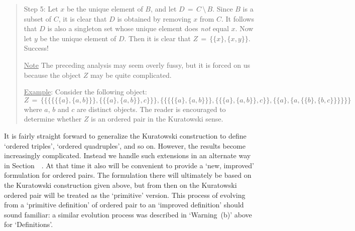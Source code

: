 \begin{quotation}
{        Step 5: Let $x$ be the unique element of $B$, and let $D \,=\, C\,{\setminus}\,B$.
    Since $B$ is a subset of $C$, it is clear that $D$ is obtained by removing $x$ from $C$.
    It follows that $D$ is also a singleton set whose unique element does {\em not} equal $x$.
    Now let $y$ be the unique element of $D$. Then it is clear that $Z \,=\, \{\{x\},\{x,y\}\}$. Success!

\V

       \underline{Note} The preceding analysis may seem overly fussy, but it is forced on us because the object $Z$ may be quite complicated.

        \underline{Example}: Consider the following object:         \begin{displaymath}
Z \,=\, 
                \{
            \{
        \{
           \{
            \{
              \{a\},\{a,b\}
            \}
           \}
             ,
        \{
           \{\{a\},\{a,b\}\} , c
            \}
        \}
            \}
                         ,
            \{
        \{
           \{
            \{
              \{a\},\{a,b\}
            \}
           \}
             ,
        \{
           \{\{a\},\{a,b\}\} , c
            \}
        \},
          \{\{a\},\{a,\{\{b\},\{b,c\}\}\}\}
            \}
                \}
        \end{displaymath}
    where $a$, $b$ and $c$ are distinct objects.
    The reader is encouraged to determine whether $Z$ is an ordered pair in the Kuratowski sense.
}%
\end{quotation} 

\V
\V


        It is fairly straight forward to generalize the Kuratowski construction to define `ordered triples', `ordered quadruples', and so on.
    However, the results become increasingly complicated. Instead we handle such extensions in an alternate way in Section~~.
    At that time it also will be convenient to provide a `new, improved' formulation for ordered pairs.
    The formulation there will ultimately be based on the Kuratowski construction given above,
    but from then on the Kuratowski ordered pair will be treated as the `primitive' version.
    This process of evolving from a `primitive definition' of ordered pair to an `improved definition' should sound familiar:
    a similar evolution process was described in `Warning~(b)' above for `Definitions'.

